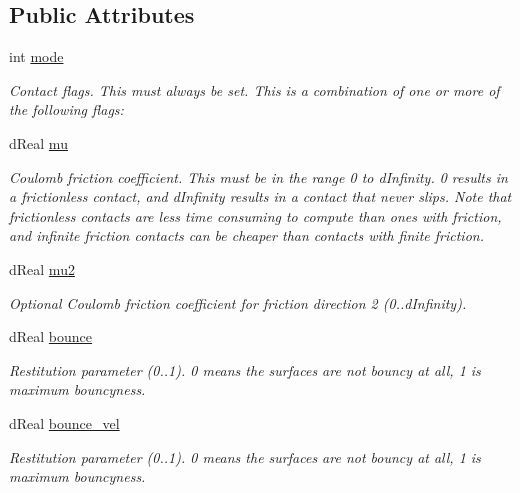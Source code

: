 \subsection*{Public Attributes}
\begin{DoxyCompactItemize}
\item 
int \hyperlink{struct_tao_1_1_ode_1_1_ode_1_1d_surface_parameters_aae7058942ccb4df5cf6fbe3176965fd6}{mode}
\begin{DoxyCompactList}\small\item\em Contact flags. This must always be set. This is a combination of one or more of the following flags: \item\end{DoxyCompactList}\item 
dReal \hyperlink{struct_tao_1_1_ode_1_1_ode_1_1d_surface_parameters_a2a60d95da0f8ca8b32f22febdd2319b3}{mu}
\begin{DoxyCompactList}\small\item\em Coulomb friction coefficient. This must be in the range 0 to dInfinity. 0 results in a frictionless contact, and dInfinity results in a contact that never slips. Note that frictionless contacts are less time consuming to compute than ones with friction, and infinite friction contacts can be cheaper than contacts with finite friction. \item\end{DoxyCompactList}\item 
dReal \hyperlink{struct_tao_1_1_ode_1_1_ode_1_1d_surface_parameters_a36843e30f735975c949e7c9705f97e3f}{mu2}
\begin{DoxyCompactList}\small\item\em Optional Coulomb friction coefficient for friction direction 2 (0..dInfinity). \item\end{DoxyCompactList}\item 
dReal \hyperlink{struct_tao_1_1_ode_1_1_ode_1_1d_surface_parameters_a19b4e15c93286cc09d1a92493b04fec9}{bounce}
\begin{DoxyCompactList}\small\item\em Restitution parameter (0..1). 0 means the surfaces are not bouncy at all, 1 is maximum bouncyness. \item\end{DoxyCompactList}\item 
dReal \hyperlink{struct_tao_1_1_ode_1_1_ode_1_1d_surface_parameters_af77b6d5d3b2ba9a132d65a9ed46e32d4}{bounce\_\-vel}
\begin{DoxyCompactList}\small\item\em Restitution parameter (0..1). 0 means the surfaces are not bouncy at all, 1 is maximum bouncyness. \item\end{DoxyCompactList}\item 

\end{DoxyCompactItemize}
